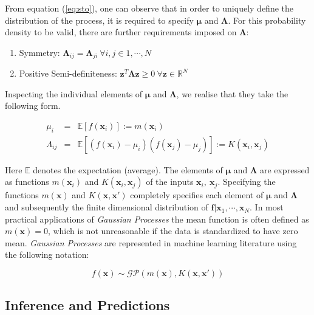 \documentclass[referee,a4paper,12pt,traditabstract]{swsc}
\begin{document}
\begin{linenumbers}
From equation (\ref{eq:sto}), one can observe that in order to uniquely define the distribution of the process, it is required to specify $\mathbf{\mu}$ and $\mathbf{\Lambda}$. For this probability density to be valid, there are further requirements imposed on $\mathbf{\Lambda}$: 

\begin{enumerate}
      \item Symmetry: $\mathbf{\Lambda}_{ij} = \mathbf{\Lambda}_{ji} \ \forall i,j \in {1, \cdots, N} $ 
      \item Positive Semi-definiteness: $\mathbf{z}^T \mathbf{\Lambda} \mathbf{z} \geq 0 \ \forall \mathbf{z} \in \mathbb{R}^N$  
\end{enumerate}

Inspecting the individual elements of $\mathbf{\mu}$ and $\mathbf{\Lambda}$, we realise that they take the following form.

\begin{eqnarray}
      \mu_i & = & \mathbb{E}[f(\mathbf{x}_i)] := m(\mathbf{x}_i) \\
      \Lambda_{ij} & = & \mathbb{E}[(f(\mathbf{x}_i) - \mu_i)(f(\mathbf{x}_j) - \mu_j)] := K(\mathbf{x}_i, \mathbf{x}_j)
\end{eqnarray}

Here $\mathbb{E}$ denotes the expectation (average). The elements of $\mathbf{\mu}$ and $\mathbf{\Lambda}$ are expressed as functions $m(\mathbf{x}_i)$ and $K(\mathbf{x}_i, \mathbf{x}_j)$ of the inputs $\mathbf{x}_i,\ \mathbf{x}_j$. Specifying the functions $m(\mathbf{x})$ and $K(\mathbf{x}, \mathbf{x}')$ completely specifies each element of $\mathbf{\mu}$ and $\mathbf{\Lambda}$ and subsequently the finite dimensional distribution of $\mathbf{f} | \mathbf{x}_1, \cdots, \mathbf{x}_N $. In most practical applications of \emph{Gaussian Processes} the mean function is often defined as $m(\mathbf{x}) = 0$, which is not unreasonable if the data is standardized to have zero mean. \emph{Gaussian Processes} are represented in machine learning literature using the following notation:

\begin{equation}
    f(\mathbf{x}) \sim \mathcal{GP}(m(\mathbf{x}), K(\mathbf{x}, \mathbf{x}'))
\end{equation}

\subsection{Inference and Predictions} \label{sec:inference}


\end{linenumbers}
\end{document}

